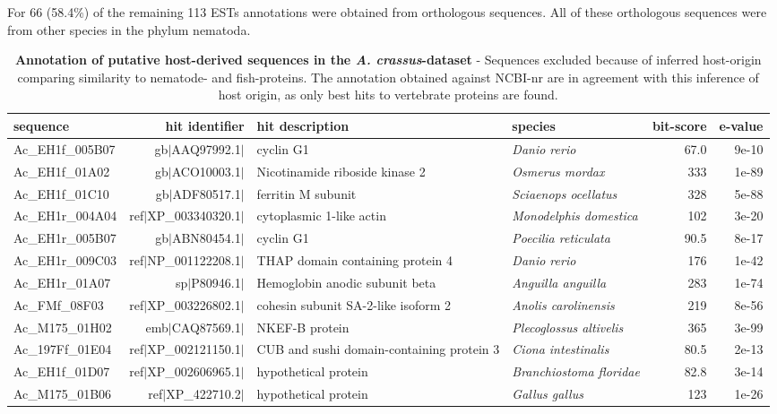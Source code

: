 For 66 (58.4\%) of the remaining 113 ESTs annotations were obtained
from orthologous sequences. All of these orthologous sequences were
from other species in the phylum nematoda.

\begin{sidewaystable}[ht]
\begin{center}
\begin{tabular}{lrp{3.5cm}lrr}
  \hline
  sequence & hit identifier & hit description &species & bit-score & e-value \\
  \hline
  Ac\_EH1f\_005B07 & gb$|$AAQ97992.1$|$ & cyclin G1 & \textit{Danio rerio} & 67.0 & 9e-10 \\ 
  Ac\_EH1f\_01A02 & gb$|$ACO10003.1$|$ &  Nicotinamide riboside kinase 2 & \textit{Osmerus mordax} &  333 & 1e-89 \\ 
  Ac\_EH1f\_01C10 & gb$|$ADF80517.1$|$ & ferritin M subunit & \textit{Sciaenops ocellatus}  &  328 & 5e-88 \\ 
  Ac\_EH1r\_004A04 & ref$|$XP\_003340320.1$|$ & cytoplasmic 1-like actin & \textit{Monodelphis domestica}  &  102 &3e-20 \\ 
  Ac\_EH1r\_005B07 & gb$|$ABN80454.1$|$ & cyclin G1  &\textit{Poecilia reticulata}  & 90.5 & 8e-17 \\ 
  Ac\_EH1r\_009C03 & ref$|$NP\_001122208.1$|$ & THAP domain containing protein 4 & \textit{Danio rerio}  &  176 & 1e-42 \\ 
  Ac\_EH1r\_01A07 & sp$|$P80946.1$|$ & Hemoglobin anodic subunit beta &\textit{Anguilla anguilla} & 283 &1e-74 \\ 
  Ac\_FMf\_08F03 & ref$|$XP\_003226802.1$|$ & cohesin subunit SA-2-like isoform 2 & \textit{Anolis carolinensis}  &  219 &8e-56 \\ 
  Ac\_M175\_01H02 & emb$|$CAQ87569.1$|$ & NKEF-B protein & \textit{Plecoglossus altivelis}  &  365 &3e-99 \\ 
  Ac\_197Ff\_01E04 & ref$|$XP\_002121150.1$|$ & CUB and sushi domain-containing protein 3 & \textit{Ciona intestinalis} & 80.5 & 2e-13 \\ 
  Ac\_EH1f\_01D07  & ref$|$XP\_002606965.1$|$ & hypothetical protein & \textit{Branchiostoma floridae} & 82.8 &3e-14 \\ 
  Ac\_M175\_01B06 & ref$|$XP\_422710.2$|$ & hypothetical protein & \textit{Gallus gallus} &  123 &1e-26 \\
  \hline
\end{tabular}
\end{center}
\caption[Annotation of putative host-derived sequences in the
\textit{A. crassus}-dataset]{\textbf{Annotation of putative
    host-derived sequences in the \textit{A. crassus}-dataset} -
  Sequences excluded because of inferred host-origin comparing
  similarity to nematode- and fish-proteins. The annotation obtained
  against NCBI-nr are in agreement with this inference of host origin,
  as only best hits to vertebrate proteins are found.}
\label{tab:hostan}
\end{sidewaystable}

     
